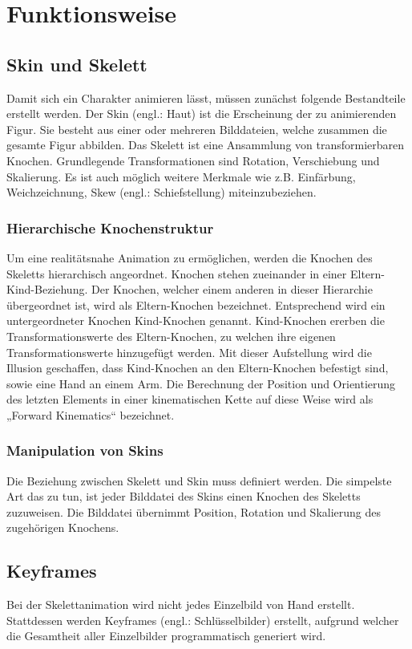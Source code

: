 %
%
%
\chapter{Funktionsweise}
\label{cha:funktionsweise}
%
%
\section{Skin und Skelett}
\label{sec:skin_und_skelett}
%
Damit sich ein Charakter animieren lässt, müssen zunächst folgende Bestandteile erstellt werden. Der Skin (engl.: Haut) ist die Erscheinung der zu animierenden Figur. Sie besteht aus einer oder mehreren Bilddateien, welche zusammen die gesamte Figur abbilden.
Das Skelett ist eine Ansammlung von transformierbaren Knochen. Grundlegende Transformationen sind Rotation, Verschiebung und Skalierung. Es ist auch möglich weitere Merkmale wie z.B. Einfärbung, Weichzeichnung, Skew (engl.: Schiefstellung) miteinzubeziehen.
\subsection{Hierarchische Knochenstruktur}
Um eine realitätsnahe Animation zu ermöglichen, werden die Knochen des Skeletts hierarchisch angeordnet. Knochen stehen zueinander in einer Eltern-Kind-Beziehung. Der Knochen, welcher einem anderen in dieser Hierarchie übergeordnet ist, wird als Eltern-Knochen bezeichnet. Entsprechend wird ein untergeordneter Knochen Kind-Knochen genannt. Kind-Knochen ererben die Transformationswerte des Eltern-Knochen, zu welchen ihre eigenen Transformationswerte hinzugefügt werden. Mit dieser Aufstellung wird die Illusion geschaffen, dass Kind-Knochen an den Eltern-Knochen befestigt sind, sowie eine Hand an einem Arm. Die Berechnung der Position und Orientierung des letzten Elements in einer kinematischen Kette auf diese Weise wird als „Forward Kinematics“ bezeichnet.
\subsection{Manipulation von Skins}
Die Beziehung zwischen Skelett und Skin muss definiert werden. Die simpelste Art das zu tun, ist jeder Bilddatei des Skins einen Knochen des Skeletts zuzuweisen. Die Bilddatei übernimmt Position, Rotation und Skalierung des zugehörigen Knochens.
\section{Keyframes}
\label{sec:keyframes}
%
Bei der Skelettanimation wird nicht jedes Einzelbild von Hand erstellt. Stattdessen werden Keyframes (engl.: Schlüsselbilder) erstellt, aufgrund welcher die Gesamtheit aller Einzelbilder programmatisch generiert wird.
%

